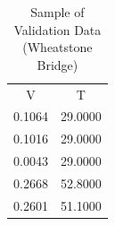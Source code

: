 \begin{table}[H]
\centering
\caption{Sample of Validation Data (Wheatstone Bridge)}
\label{table:wheatstone_validation_table}
\begin{tabular}{cc}

     V &       T \\

0.1064 & 29.0000 \\
0.1016 & 29.0000 \\
0.0043 & 29.0000 \\
0.2668 & 52.8000 \\
0.2601 & 51.1000 \\

\end{tabular}
\end{table}
